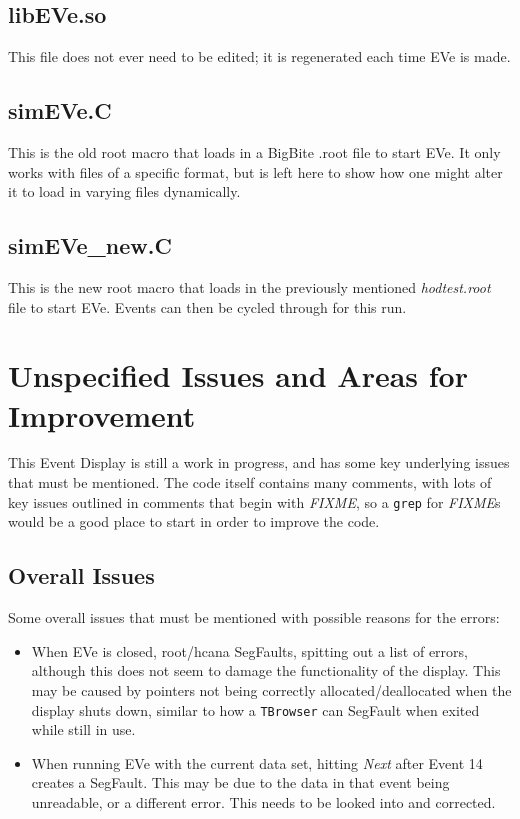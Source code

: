 \documentclass[12pt]{article}
\numberwithin{equation}{section}
\begin{document}
\subsection{libEVe.so}
This file does not ever need to be edited; it is regenerated each time EVe is made.

\subsection{simEVe.C}
This is the old root macro that loads in a BigBite .root file to start EVe. It only works with files of a specific format, but is left here to show how one might alter it to load in varying files dynamically. 

\subsection{simEVe\_new.C}
This is the new root macro that loads in the previously mentioned \textit{hodtest.root} file to start EVe. Events can then be cycled through for this run.   

\section{Unspecified Issues and Areas for Improvement}
This Event Display is still a work in progress, and has some key underlying issues that must be mentioned. The code itself contains many comments, with lots of key issues outlined in comments that begin with \textit{FIXME}, so a \texttt{grep} for \textit{FIXME}s would be a good place to start in order to improve the code.

\subsection{Overall Issues}
Some overall issues that must be mentioned with possible reasons for the errors:
\begin{itemize}
\item When EVe is closed, root/hcana SegFaults, spitting out a list of errors, although this does not seem to damage the functionality of the display. This may be caused by pointers not being correctly allocated/deallocated when the display shuts down, similar to how a \texttt{TBrowser} can SegFault when exited while still in use.
\item When running EVe with the current data set, hitting \textit{Next} after Event 14 creates a SegFault. This may be due to the data in that event being unreadable, or a different error. This needs to be looked into and corrected.
\end{itemize}
\end{document}
